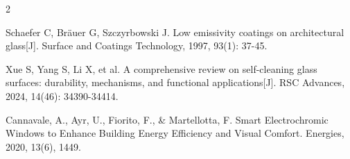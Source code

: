 \documentclass[UTF8,10pt,a4paper,fontset=none]{ctexart}
\begin{document}
\begin{multicols}{2}
\begin{enumerate}[leftmargin=1.8em,label={[}\arabic*{]},itemsep=2pt,topsep=4pt,parsep=0pt]
\item Schaefer C, Bräuer G, Szczyrbowski J. Low emissivity coatings on architectural glass[J]. Surface and Coatings Technology, 1997, 93(1): 37-45.
\item Xue S, Yang S, Li X, et al. A comprehensive review on self-cleaning glass surfaces: durability, mechanisms, and functional applications[J]. RSC Advances, 2024, 14(46): 34390-34414.
\item Cannavale, A., Ayr, U., Fiorito, F., \& Martellotta, F. Smart Electrochromic Windows to Enhance Building Energy Efficiency and Visual Comfort. Energies, 2020, 13(6), 1449.
\end{enumerate}

\end{multicols}
\end{document}

